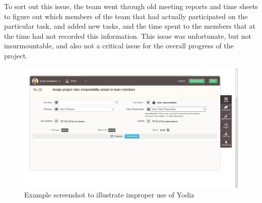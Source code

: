 To sort out this issue, the team went through old meeting reports and time sheets
to figure out which members of the team that had actually participated on the
particular task, and added new tasks, and the time spent to the members that at
the time had not recorded this information.%
This issue was unfortunate, but not insurmountable, and also not a critical
issue for the overall progress of the project.

\begin{figure}[H]
\includegraphics[width=\textwidth, clip, trim=1cm 2cm 4cm 1cm]{ch/retrospect/fig/wrongUse.png}
\caption{Example screenshot to illustrate improper use of Yodiz}
\label{fig:wrongUse}
\end{figure}


